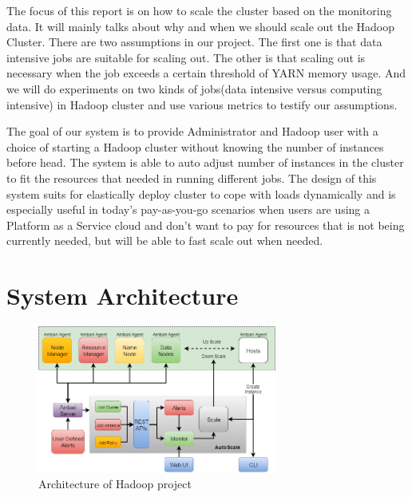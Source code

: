 \documentclass{article}
\begin{document}
The focus of this report is on how to scale the cluster based on the monitoring data. It will mainly talks about why and when we should scale out the Hadoop Cluster. There are two assumptions in our project. The first one is that data intensive jobs are suitable for scaling out. The other is that scaling out is necessary when the job exceeds a certain threshold of YARN memory usage. And we will do experiments on two kinds of jobs(data intensive versus computing intensive) in Hadoop cluster and use various metrics to testify our assumptions.

The goal of our system is to provide Administrator and Hadoop user with a choice of starting a Hadoop cluster without knowing the number of instances before head. The system is able to auto adjust number of instances in the cluster to fit the resources that needed in running different jobs. The design of this system suits for elastically deploy cluster to cope with loads dynamically and is especially useful in today's pay-as-you-go scenarios when users are using a Platform as a Service cloud and don't want to pay for resources that is not being currently needed, but will be able to fast scale out when needed.

%
%
\section{System Architecture}

\begin{figure}[ht!]
 \centering
 \includegraphics[width=0.7\textwidth,natwidth=700,natheight=600]{architecture.png}
 \caption{Architecture of Hadoop project}
 \label{fig:architecture}
 \end{figure}
 
\end{document}
